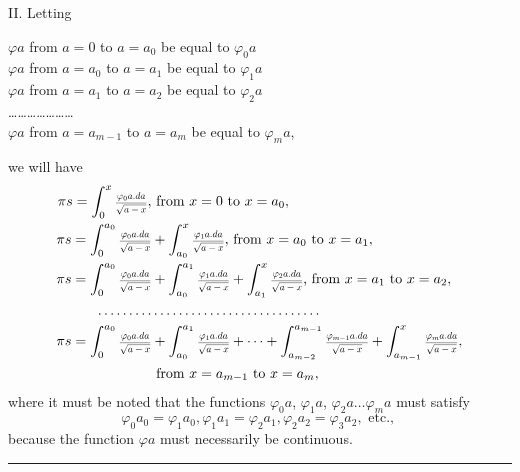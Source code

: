 \documentclass[oneside, 12 pt, leqno]{memoir}
\let\oldfrac\frac
\def\frac#1#2{\mathchoice{\text{\scalebox{.83}{${\oldfrac{#1}{#2}}$}}}{\text{\scalebox{.83}{${\displaystyle\oldfrac{#1}{#2}}$}}}{\genfrac{}{}{}{2}{#1}{#2}}{\genfrac{}{}{}{3}{#1}{#2}}}
\begin{document}
II. Letting
\begin{center}
\(\varphi a\) from \(a=0\) to \(a=a_0\) be equal to \(\varphi_0 a\) \\
\(\varphi a\) from \(a=a_0\) to \(a=a_1\) be equal to \(\varphi_1 a\) \\ 
\(\varphi a\) from \(a=a_1\) to \(a=a_2\) be equal to \(\varphi_2 a\) \\
\dots \dots \dots \dots \dots \dots \dots \\
\(\varphi a\) from \(a=a_{m-1}\) to \(a=a_m\) be equal to \(\varphi_m a\), \\
\end{center}
we will have
\[\begin{aligned}
\pi s =\int_0^x \frac{\varphi_0 a. d a}{\sqrt{a-x}},& \text { from } x=0 \text { to } x=a_0, \\
\pi s =\int_0^{a_0} \frac{\varphi_0 a. d a}{\sqrt{a-x}}&+\int_{a_0}^x \frac{\varphi_1 a. d a}{\sqrt{a-x}} \text {, from } x=a_0 \text { to } x=a_1, \\
\pi s =\int_0^{a_0} \frac{\varphi_0 a. d a}{\sqrt{a-x}}&+\int_{a_0}^{a_1} \frac{\varphi_1 a. d a}{\sqrt{a-x}}+\int_{a_1}^x \frac{\varphi_2 a. d a}{\sqrt{a-x}} \text {, from } x=a_1 \text { to } x=a_2, \\
 \dots \dots \dots & \dots \dots \dots \dots \dots \dots \dots \dots \dots \\
\pi s = \int_0^{a_0} \frac{\varphi_0 a. d a}{\sqrt{a-x}}&+\int_{a_0}^{a_1} \frac{\varphi_1 a. d a}{\sqrt{a-x}} + \dots + \int_{a_{m-2}}^{a_{m-1}} \frac{\varphi_{m-1} a. d a}{\sqrt{a-x}}+\int_{a_{m-1}}^x \frac{\varphi_m a. d a}{\sqrt{a-x}},\\
&\text{ from } x=a_{m-1} \text{ to } x=a_m,
\end{aligned}\]
where it must be noted that the functions \(\varphi_0 a\), \(\varphi_1 a\), \(\varphi_2 a \dots \varphi_m a\) must satisfy
\[\varphi_0 a_0=\varphi_1 a_0, \varphi_1 a_1=\varphi_2 a_1, \varphi_2 a_2=\varphi_3 a_2, \text { etc., }\]
because the function \(\varphi a\) must necessarily be continuous.
\begin{center}\rule{2in}{0.1pt}\end{center}
\vfill
\end{document}
